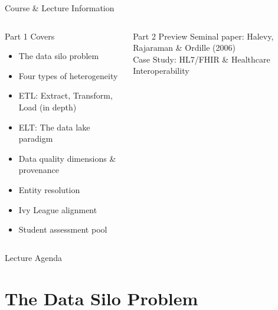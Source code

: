 \documentclass[aspectratio=169,10pt]{beamer}
\begin{document}
\begin{frame}{Course \& Lecture Information}
\begin{columns}[T]
      \begin{exampleblock}{Part 1 Covers}
        \begin{itemize}
          \item The data silo problem
          \item Four types of heterogeneity
          \item ETL: Extract, Transform, Load (in depth)
          \item ELT: The data lake paradigm
          \item Data quality dimensions \& provenance
          \item Entity resolution
          \item Ivy League alignment
          \item Student assessment pool
        \end{itemize}
      \end{exampleblock}
      \vspace{4pt}
      \begin{block}{Part 2 Preview}
        Seminal paper: Halevy, Rajaraman \& Ordille (2006)\\
        Case Study: HL7/FHIR \& Healthcare Interoperability
      \end{block}
  \end{columns}
\end{frame}

\begin{frame}{Lecture Agenda}
  \tableofcontents
\end{frame}

\section{The Data Silo Problem}
\end{document}
